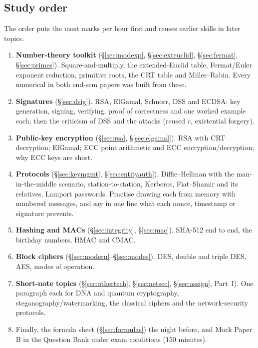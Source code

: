 \subsection{Study order}
The order puts the most marks per hour first and reuses earlier skills in later topics.
\begin{enumerate}[leftmargin=1.6em,itemsep=2pt]
\item \textbf{Number-theory toolkit} (\S\ref{sec:modexp}, \S\ref{sec:exteuclid}, \S\ref{sec:fermat}, \S\ref{sec:primes}). Square-and-multiply, the extended-Euclid table, Fermat/Euler exponent reduction, primitive roots, the CRT table and Miller--Rabin. Every numerical in both end-sem papers was built from these.
\item \textbf{Signatures} (\S\ref{sec:dsig}). RSA, ElGamal, Schnorr, DSS and ECDSA: key generation, signing, verifying, proof of correctness and one worked example each; then the criticism of DSS and the attacks (reused $r$, existential forgery).
\item \textbf{Public-key encryption} (\S\ref{sec:rsa}, \S\ref{sec:elgamal}). RSA with CRT decryption; ElGamal; ECC point arithmetic and ECC encryption/decryption; why ECC keys are short.
\item \textbf{Protocols} (\S\ref{sec:keymgmt}, \S\ref{sec:entityauth}). Diffie--Hellman with the man-in-the-middle scenario, station-to-station, Kerberos, Fiat--Shamir and its relatives, Lamport passwords. Practise drawing each from memory with numbered messages, and say in one line what each nonce, timestamp or signature prevents.
\item \textbf{Hashing and MACs} (\S\ref{sec:integrity}, \S\ref{sec:mac}). SHA-512 end to end, the birthday numbers, HMAC and CMAC.
\item \textbf{Block ciphers} (\S\ref{sec:modern}--\S\ref{sec:modes}). DES, double and triple DES, AES, modes of operation.
\item \textbf{Short-note topics} (\S\ref{sec:othertech}, \S\ref{sec:netsec}, \S\ref{sec:assign}, Part~I). One paragraph each for DNA and quantum cryptography, steganography/watermarking, the classical ciphers and the network-security protocols.
\item Finally, the formula sheet (\S\ref{sec:formulas}) the night before, and Mock Paper B in the Question Bank under exam conditions (150 minutes).
\end{enumerate}
